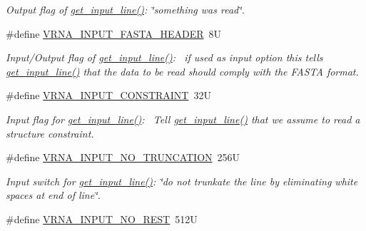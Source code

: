 \begin{DoxyCompactItemize}
\begin{DoxyCompactList}\small\item\em Output flag of \hyperlink{group__utils_ga8ef1835eb83f542396f59f0b205965e5}{get\+\_\+input\+\_\+line()}\+: {\itshape \char`\"{}something was read\char`\"{}}. \end{DoxyCompactList}\item 
\#define \hyperlink{group__utils_ga2f0d8069e93d3ac54d9320d6bdb8e7e7}{V\+R\+N\+A\+\_\+\+I\+N\+P\+U\+T\+\_\+\+F\+A\+S\+T\+A\+\_\+\+H\+E\+A\+D\+ER}~8U
\begin{DoxyCompactList}\small\item\em Input/\+Output flag of \hyperlink{group__utils_ga8ef1835eb83f542396f59f0b205965e5}{get\+\_\+input\+\_\+line()}\+:~\newline
if used as input option this tells \hyperlink{group__utils_ga8ef1835eb83f542396f59f0b205965e5}{get\+\_\+input\+\_\+line()} that the data to be read should comply with the F\+A\+S\+TA format. \end{DoxyCompactList}\item 
\#define \hyperlink{group__utils_gac08a9df45b9721b97a47dbfe7a6e5f85}{V\+R\+N\+A\+\_\+\+I\+N\+P\+U\+T\+\_\+\+C\+O\+N\+S\+T\+R\+A\+I\+NT}~32U
\begin{DoxyCompactList}\small\item\em Input flag for \hyperlink{group__utils_ga8ef1835eb83f542396f59f0b205965e5}{get\+\_\+input\+\_\+line()}\+:~\newline
Tell \hyperlink{group__utils_ga8ef1835eb83f542396f59f0b205965e5}{get\+\_\+input\+\_\+line()} that we assume to read a structure constraint. \end{DoxyCompactList}\item 
\#define \hyperlink{group__utils_ga086742158293217a46ae2f71bb296937}{V\+R\+N\+A\+\_\+\+I\+N\+P\+U\+T\+\_\+\+N\+O\+\_\+\+T\+R\+U\+N\+C\+A\+T\+I\+ON}~256U\hypertarget{group__utils_ga086742158293217a46ae2f71bb296937}{}\label{group__utils_ga086742158293217a46ae2f71bb296937}

\begin{DoxyCompactList}\small\item\em Input switch for \hyperlink{group__utils_ga8ef1835eb83f542396f59f0b205965e5}{get\+\_\+input\+\_\+line()}\+: {\itshape \char`\"{}do not trunkate the line by eliminating white spaces at end of line\char`\"{}}. \end{DoxyCompactList}\item 
\#define \hyperlink{group__utils_ga7a2e8c50a0c7ce82e60da1016e1367fd}{V\+R\+N\+A\+\_\+\+I\+N\+P\+U\+T\+\_\+\+N\+O\+\_\+\+R\+E\+ST}~512U\hypertarget{group__utils_ga7a2e8c50a0c7ce82e60da1016e1367fd}{}\label{group__utils_ga7a2e8c50a0c7ce82e60da1016e1367fd}


\end{DoxyCompactItemize}
